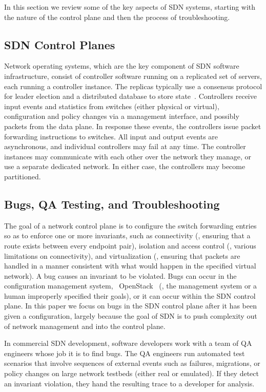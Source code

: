 In this section we review some of the key aspects of SDN systems, starting with the nature of the control plane and then the process of troubleshooting.

\subsection{SDN Control Planes}
Network operating systems, which are the key component of SDN software
infrastructure, consist of controller software running on a replicated set of
servers, each running a controller instance. The replicas typically use a
consensus protocol for leader election and a distributed database to store
state~\cite{onix}. Controllers receive input events and
statistics from switches (either physical or virtual), configuration and
policy changes via a management interface, and possibly packets from the data
plane. In response these events, the
controllers issue packet forwarding instructions to switches. All input
and output events are asynchronous, and individual controllers may fail at any
time. The controller instances may communicate
with each other over the network they manage, or use a separate dedicated
network. In either case, the controllers may become partitioned.

\subsection{Bugs, QA Testing, and Troubleshooting}
The goal of a network control plane is to configure the switch forwarding entries so as to
enforce one or more invariants, such as connectivity (\ie, ensuring that a
route exists between every endpoint pair), isolation and access control (\ie, various limitations on
connectivity), and virtualization (\ie, ensuring that packets are handled
in a manner consistent with what would happen in the specified virtual
network). A bug causes an invariant to be violated. Bugs can occur in the
configuration management system, \eg~OpenStack~\cite{quantum} (\ie, the
management system or a human improperly specified their goals), or it
can occur within the SDN control plane. In this paper we focus on bugs in the
SDN control plane after it has been given a configuration,
largely because the goal of SDN is to push complexity out of network management
and into the control plane.

In commercial SDN development, software developers work with a team of QA engineers whose
job it is to find bugs. The QA engineers run automated test scenarios that involve
sequences of external events such as failures, migrations, or policy changes
on large network testbeds (either real or emulated).
If they detect an invariant violation, they hand the resulting trace to a developer for analysis.

